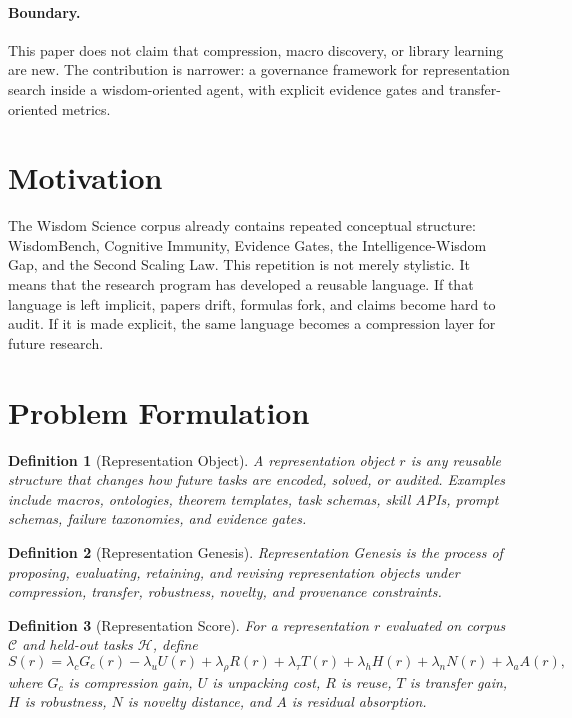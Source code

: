 \documentclass[11pt]{article}
\newtheorem{definition}{Definition}
\begin{document}
\paragraph{Boundary.}
This paper does not claim that compression, macro discovery, or library learning are new.
The contribution is narrower: a governance framework for representation search inside a wisdom-oriented agent, with explicit evidence gates and transfer-oriented metrics.

\section{Motivation}

The Wisdom Science corpus already contains repeated conceptual structure: WisdomBench, Cognitive Immunity, Evidence Gates, the Intelligence-Wisdom Gap, and the Second Scaling Law.
This repetition is not merely stylistic.
It means that the research program has developed a reusable language.
If that language is left implicit, papers drift, formulas fork, and claims become hard to audit.
If it is made explicit, the same language becomes a compression layer for future research.

\section{Problem Formulation}

\begin{definition}[Representation Object]
A representation object $r$ is any reusable structure that changes how future tasks are encoded, solved, or audited.
Examples include macros, ontologies, theorem templates, task schemas, skill APIs, prompt schemas, failure taxonomies, and evidence gates.
\end{definition}

\begin{definition}[Representation Genesis]
Representation Genesis is the process of proposing, evaluating, retaining, and revising representation objects under compression, transfer, robustness, novelty, and provenance constraints.
\end{definition}

\begin{definition}[Representation Score]
For a representation $r$ evaluated on corpus $\mathcal{C}$ and held-out tasks $\mathcal{H}$, define
\[
S(r)=
\lambda_c G_c(r)
-\lambda_u U(r)
+\lambda_\rho R(r)
+\lambda_\tau T(r)
+\lambda_h H(r)
+\lambda_n N(r)
+\lambda_a A(r),
\]
where $G_c$ is compression gain, $U$ is unpacking cost, $R$ is reuse, $T$ is transfer gain, $H$ is robustness, $N$ is novelty distance, and $A$ is residual absorption.
\end{definition}
\end{document}

